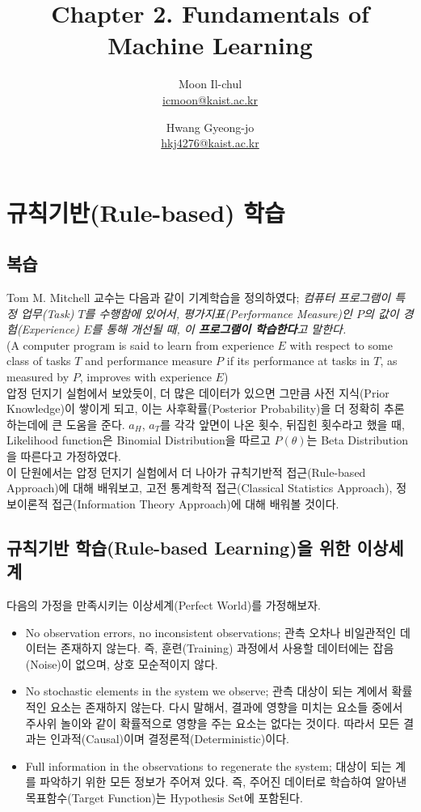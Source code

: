 \documentclass[a4paper]{oblivoir}
\author{Moon Il-chul \\ \href{mailto:icmoon@kaist.ac.kr}{icmoon@kaist.ac.kr} 
   \and Hwang Gyeong-jo \\ \href{mailto:hkj4276@kaist.ac.kr}{hkj4276@kaist.ac.kr} }
\title{Chapter 2. Fundamentals of Machine Learning}
\begin{document}
\maketitle
\tableofcontents

\section{규칙기반(Rule-based) 학습}

\subsection{복습}
Tom M. Mitchell 교수는 다음과 같이 기계학습을 정의하였다; \textit{컴퓨터 프로그램이 특정 업무(Task) $T$를 수행함에 있어서, 평가지표(Performance Measure)인 $P$의 값이 경험(Experience) $E$를 통해 개선될 때, 이 \textbf{프로그램이 학습한다}고 말한다.}\\
(A computer program is said to learn from experience $E$ with respect to some class of tasks $T$ and performance measure $P$ if its performance at tasks in $T$, as measured by $P$, improves with experience $E$)\\
\indent 압정 던지기 실험에서 보았듯이, 더 많은 데이터가 있으면 그만큼 사전 지식(Prior Knowledge)이 쌓이게 되고, 이는 사후확률(Posterior Probability)을 더 정확히 추론하는데에 큰 도움을 준다. $a_{H}$, $a_{T}$를 각각 앞면이 나온 횟수, 뒤집힌 횟수라고 했을 때, Likelihood function은 Binomial Distribution을 따르고 $P(\theta)$는 Beta Distribution을 따른다고 가정하였다.\\
\indent 이 단원에서는 압정 던지기 실험에서 더 나아가 규칙기반적 접근(Rule-based Approach)에 대해 배워보고,  고전 통계학적 접근(Classical Statistics Approach), 정보이론적 접근(Information Theory Approach)에 대해 배워볼 것이다.\\

\subsection{규칙기반 학습(Rule-based Learning)을 위한 이상세계}
다음의 가정을 만족시키는 이상세계(Perfect World)를 가정해보자.
\begin{itemize}
\item No observation errors, no inconsistent observations; 관측 오차나 비일관적인 데이터는 존재하지 않는다. 즉, 훈련(Training) 과정에서 사용할 데이터에는 잡음(Noise)이 없으며, 상호 모순적이지 않다.
\item No stochastic elements in the system we observe; 관측 대상이 되는 계에서 확률적인 요소는 존재하지 않는다. 다시 말해서, 결과에 영향을 미치는 요소들 중에서 주사위 놀이와 같이 확률적으로 영향을 주는 요소는 없다는 것이다. 따라서 모든 결과는 인과적(Causal)이며 결정론적(Deterministic)이다.
\item Full information in the observations to regenerate the system; 대상이 되는 계를 파악하기 위한 모든 정보가 주어져 있다. 즉, 주어진 데이터로 학습하여 알아낸 목표함수(Target Function)는 Hypothesis Set에 포함된다. \\
\end{itemize}
\end{document}
